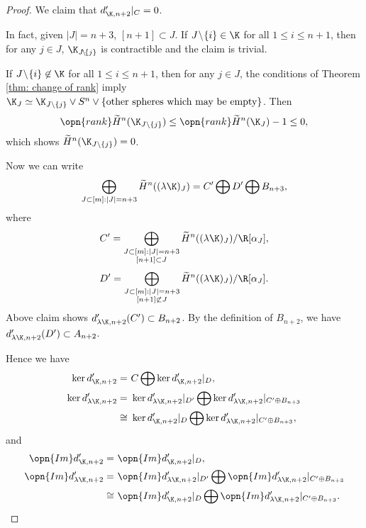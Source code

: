 \begin{proof}
We claim that $d'_{\K,n+2}|_C=0$. 

In fact, given $|J|=n+3$, $[n+1]\subset J$. If $J\!\setminus\! \{i\}\in \K$ for all $1\le i\le n+1$, then for any $j\in J$, $\K_{J\!\setminus\! \{j\}}$
is contractible and the claim is trivial. 

If $J\!\setminus\! \{i\}\not\in \K$ for all $1\le i\le n+1$,
then for any $j\in J$,
the conditions of Theorem \ref{thm: change of rank}
imply $\K_J\simeq \K_{J\setminus \{j\}}\vee S^n\vee \{\text{other spheres which may be empty}\}$. Then
$$\opn{rank} \widetilde{H}^n(\K_{J\setminus \{j\}})\le
\opn{rank} \widetilde{H}^n(\K_J)-1\le 0,$$
which shows $\widetilde{H}^n(\K_{J\setminus \{j\}})=0$.


Now we can write
$$\bigoplus_{J\subset [m]:|J|=n+3}
\widetilde{H}^n((\lambda\K)_J)=C'\bigoplus D'\bigoplus B_{n+3},$$
where
$$C'=\bigoplus_{\substack{J\subset [m]:|J|=n+3\\ [n+1]\subset J}} \widetilde{H}^n((\lambda\K)_J)/\R[\alpha_J],$$
$$D'=\bigoplus_{\substack{J\subset [m]:|J|=n+3\\ [n+1]\not\subset J}} \widetilde{H}^n((\lambda\K)_J)/\R[\alpha_J].$$
Above claim shows $d'_{\lambda\K,n+2}(C')\subset B_{n+2}$.
By the definition of $B_{n+2}$, we have $d'_{\lambda
\K,n+2}(D')\subset A_{n+2}$.

Hence we have
\begin{equation*}
    \begin{split}
        \ker d'_{\K,n+2}= &\ C\bigoplus \ker d'_{\K,n+2}|_D,\\
        \ker d'_{\lambda\K,n+2} = &\ \ker d'_{\lambda\K,n+2}|_{D'}\bigoplus
        \ker d'_{\lambda\K,n+2}|_{C'\oplus B_{n+3}}\\
        \cong &\ \ker d'_{\K,n+2}|_D\bigoplus
        \ker d'_{\lambda\K,n+2}|_{C'\oplus B_{n+3}},
    \end{split}
\end{equation*}
and 
\begin{equation*}
    \begin{split}
        \opn{Im} d'_{\K,n+2}= &\ \opn{Im} d'_{\K,n+2}|_D,\\
        \opn{Im} d'_{\lambda\K,n+2} = &\ \opn{Im} d'_{\lambda\K,n+2}|_{D'}\bigoplus
        \opn{Im} d'_{\lambda\K,n+2}|_{C'\oplus B_{n+3}}\\
        \cong &\ \opn{Im} d'_{\K,n+2}|_D\bigoplus
        \opn{Im} d'_{\lambda\K,n+2}|_{C'\oplus B_{n+3}}.
    \end{split}
\end{equation*}


\end{proof}
